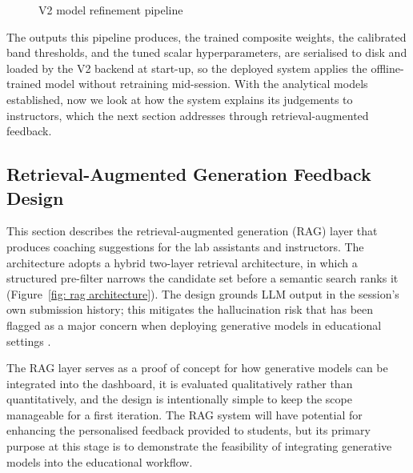 \begin{figure}[H]
    \caption{V2 model refinement pipeline}
    \label{fig:v2-pipeline-design}
\end{figure}
The outputs this pipeline produces, the trained composite weights, the calibrated band thresholds, and the tuned scalar hyperparameters, are serialised to disk and loaded by the V2 backend at start-up, so the deployed system applies the offline-trained model without retraining mid-session. With the analytical models established, now we look at how the system explains its judgements to instructors, which the next section addresses through retrieval-augmented feedback.




\subsection{Retrieval-Augmented Generation Feedback Design}

This section describes the retrieval-augmented generation (RAG) layer that produces coaching suggestions for the lab assistants and instructors.
The architecture adopts a hybrid two-layer retrieval architecture, in which a structured pre-filter narrows the candidate set before a semantic search ranks it (Figure~\ref{fig: rag architecture}).
The design grounds LLM output in the session's own submission history; this mitigates the hallucination risk that has been flagged as a major concern when deploying generative models in educational settings \cite{lewisRetrievalAugmentedGenerationKnowledgeIntensive2020,kasneciChatGPTGoodOpportunities2023}.

The RAG layer serves as a proof of concept for how generative models can be integrated into the dashboard, it is evaluated qualitatively rather than quantitatively, and the design is intentionally simple to keep the scope manageable for a first iteration. 
The RAG system will have potential for enhancing the personalised feedback provided to students, but its primary purpose at this stage is to demonstrate the feasibility of integrating generative models into the educational workflow.

